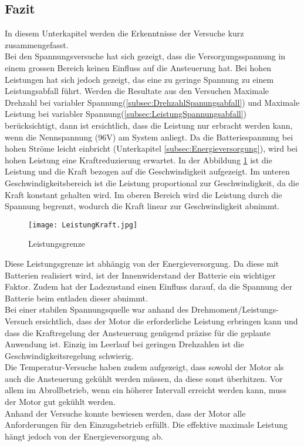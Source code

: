 \subsection{Fazit}\label{subsec:Fazit}
In diesem Unterkapitel werden die Erkenntnisse der Versuche kurz zusammengefasst.\\

Bei den Spannungsversuche hat sich gezeigt, dass die Versorgungsspannung in einem grossen Bereich keinen Einfluss auf die Ansteuerung hat. Bei hohen Leistungen hat sich jedoch gezeigt, das eine zu geringe Spannung zu einem Leistungsabfall führt. Werden die Resultate aus den Versuchen \glqq Maximale Drehzahl bei variabler Spannung\grqq (\ref{subsec:DrehzahlSpanungsabfall}) und \glqq Maximale Leistung bei variabler Spannung\grqq (\ref{subsec:LeistungSpannungsabfall}) berücksichtigt, dann ist ersichtlich, dass die Leistung nur erbracht werden kann, wenn die Nennspannung (96V) am System anliegt. Da die Batteriespannung bei hohen Ströme leicht einbricht (Unterkapitel \ref{subsec:Energieversorgung}), wird bei hohen Leistung eine Kraftreduzierung erwartet. In der Abbildung \ref{fig:LeistungKraft} ist die Leistung und die Kraft bezogen auf die Geschwindigkeit aufgezeigt. Im unteren Geschwindigkeitsbereich ist die Leistung proportional zur Geschwindigkeit, da die Kraft konstant gehalten wird. Im oberen Bereich wird die Leistung durch die Spannung begrenzt, wodurch die Kraft linear zur Geschwindigkeit abnimmt.

\begin{figure}[H]
	\centering
	\texttt{[image: LeistungKraft.jpg]}
	\caption{Leistungsgrenze}\label{fig:LeistungKraft}
\end{figure}

Diese Leistungsgrenze ist abhängig von der Energieversorgung. Da diese mit Batterien realisiert wird, ist der Innenwiderstand der Batterie ein wichtiger Faktor. Zudem hat der Ladezustand einen Einfluss darauf, da die Spannung der Batterie beim entladen dieser abnimmt.\\
Bei einer stabilen Spannungsquelle war anhand des Drehmoment/Leistungs-Versuch ersichtlich, dass der Motor die erforderliche Leistung erbringen kann und dass die Kraftregelung der Ansteuerung genügend präzise für die geplante Anwendung ist. Einzig im Leerlauf bei geringen Drehzahlen ist die Geschwindigkeitsregelung schwierig.\\
Die Temperatur-Versuche haben zudem aufgezeigt, dass sowohl der Motor als auch die Ansteuerung gekühlt werden müssen, da diese sonst überhitzen. Vor allem im Abrollbetrieb, wenn ein höherer Intervall erreicht werden kann, muss der Motor gut gekühlt werden.\\
Anhand der Versuche konnte bewiesen werden, dass der Motor alle Anforderungen für den Einzugsbetrieb erfüllt. Die effektive maximale Leistung hängt jedoch von der Energieversorgung ab.